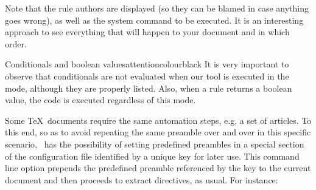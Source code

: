 \begin{description}

Note that the rule authors are displayed (so they can be blamed in case anything goes wrong), as well as the system command to be executed. It is an interesting approach to see everything that will happen to your document and in which order.

\begin{messagebox}{Conditionals and boolean values}{attentioncolour}{\icattention}{black}
It is very important to observe that conditionals are not evaluated when our tool is executed in the  mode, although they are properly listed. Also, when a rule returns a boolean value, the code is executed regardless of this mode.
\end{messagebox}

\item[\describeopp{p}{preamble}{name}] Some \TeX\ documents require the same automation steps, e.g, a set of articles. To this end, so as to avoid repeating the same preamble over and over in this specific scenario, \arara\ has the possibility of setting predefined preambles in a special section of the configuration file identified by a unique key for later use. This command line option prepends the predefined preamble referenced by the  key to the current document and then proceeds to extract directives, as usual. For instance:


\end{description}

